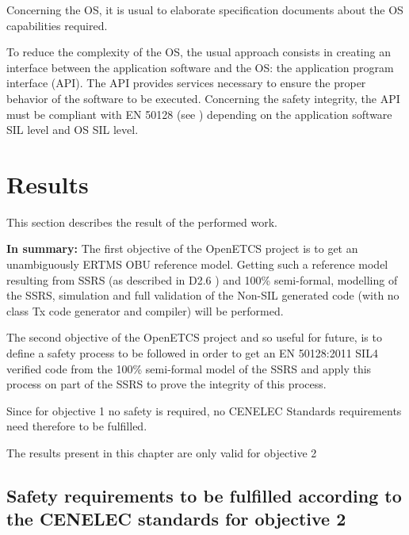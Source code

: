 \documentclass{template/openetcs_report}
\begin{document}
Concerning the OS, it is usual to elaborate specification documents about the OS capabilities required.

To reduce the complexity of the OS, the usual approach consists in creating an interface between the application software and the OS: the application program interface (API).
The API provides services necessary to ensure the proper behavior of the software to be executed. Concerning the safety integrity, the API must be compliant with EN 50128 (see \cite{EN50128}) depending on the application software SIL level and OS SIL level.


\chapter{Results}
\label{objective}
This section describes the result of the performed work.

\textbf{In summary:}
The first objective of the OpenETCS project is to get an unambiguously ERTMS OBU reference model. Getting such a reference model resulting from SSRS (as described in D2.6 \cite{D26}) and 100\% semi-formal, modelling of the SSRS, simulation and full validation of the Non-SIL generated code (with no class Tx code generator and compiler) will be performed.

The second objective of the OpenETCS project and so useful for future, is to define a safety process to be followed in order to get an EN 50128:2011 SIL4 verified code from the 100\% semi-formal model of the SSRS and apply this process on part of the SSRS to prove the integrity of this process.

Since for objective 1 no safety is required, no CENELEC Standards requirements need therefore to be fulfilled.

The results present in this chapter are only valid for objective 2


\section{Safety requirements to be fulfilled according to the CENELEC standards for objective 2}
\end{document}
